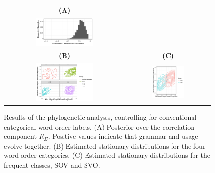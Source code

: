 \documentclass[11pt,a4paper]{article}
\begin{document}
\begin{figure}
    \centering
	\begin{tabular}{cc}
		\textbf{(A)} \\
    \includegraphics[width=0.5\textwidth]{../change/ornuhl-binom/categorical_order_gamma/fits/corr_sigma.pdf}
		\\
		\textbf{(B)} & \textbf{(C)} \\
		\includegraphics[width=0.5\textwidth]{../change/ornuhl-binom/categorical_order_gamma/fits/stationary_case_facet.pdf} &
    \includegraphics[width=0.4\textwidth]{../change/ornuhl-binom/categorical_order_gamma/fits/stationary_case_svo_sov.pdf}
	\end{tabular}
	\caption{Results of the phylogenetic analysis, controlling for conventional categorical word order labels. (A) Posterior over the correlation component $R_\Sigma$. Positive values indicate that grammar and usage evolve together. (B) Estimated stationary distributions for the four word order categories. (C) Estimated stationary distributions for the frequent classes, SOV and SVO.}
    \label{fig:langs-categorical}
\end{figure}
\end{document}
